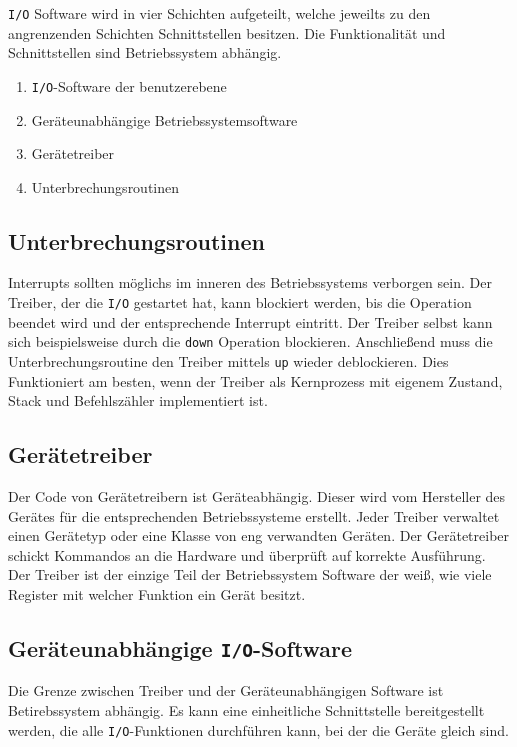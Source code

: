 \texttt{I/O} Software wird in vier Schichten aufgeteilt, welche jeweilts zu den angrenzenden Schichten Schnittstellen besitzen. Die Funktionalität und Schnittstellen sind Betriebssystem abhängig.

\begin{enumerate}
    \item \texttt{I/O}-Software der benutzerebene
    \item Geräteunabhängige Betriebssystemsoftware
    \item Gerätetreiber
    \item Unterbrechungsroutinen
\end{enumerate}

\subsection{Unterbrechungsroutinen}

Interrupts sollten möglichs im inneren des Betriebssystems verborgen sein. Der
Treiber, der die \texttt{I/O} gestartet hat, kann blockiert werden, bis die
Operation beendet wird und der entsprechende Interrupt eintritt. Der Treiber
selbst kann sich beispielsweise durch die \texttt{down} Operation blockieren.
Anschließend muss die Unterbrechungsroutine den Treiber mittels \texttt{up}
wieder deblockieren. Dies Funktioniert am besten, wenn der Treiber als
Kernprozess mit eigenem Zustand, Stack und Befehlszähler implementiert ist.

\subsection{Gerätetreiber}

Der Code von Gerätetreibern ist Geräteabhängig. Dieser wird vom Hersteller des
Gerätes für die entsprechenden Betriebssysteme erstellt. Jeder Treiber
verwaltet einen Gerätetyp oder eine Klasse von eng verwandten Geräten. Der
Gerätetreiber schickt Kommandos an die Hardware und überprüft auf korrekte
Ausführung. Der Treiber ist der einzige Teil der Betriebssystem Software der
weiß, wie viele Register mit welcher Funktion ein Gerät besitzt.

\subsection{Geräteunabhängige \texttt{I/O}-Software}

Die Grenze zwischen Treiber und der Geräteunabhängigen Software ist
Betirebssystem abhängig. Es kann eine einheitliche Schnittstelle bereitgestellt
werden, die alle \texttt{I/O}-Funktionen durchführen kann, bei der die Geräte
gleich sind.

